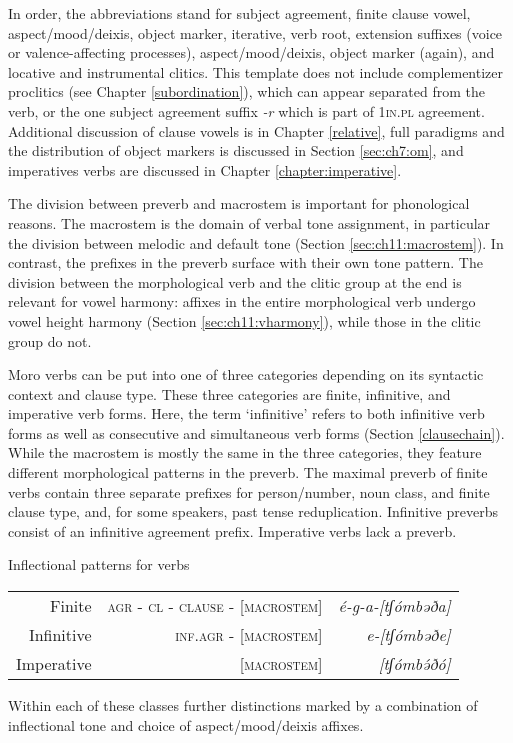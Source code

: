 In order, the abbreviations stand for subject agreement, finite clause vowel, aspect/mood/deixis, object marker, iterative, verb root, extension suffixes (voice or valence-affecting processes), aspect/mood/deixis, object marker (again), and locative and instrumental clitics. This template does not include complementizer proclitics (see Chapter \ref{subordination}), which can appear separated from the verb, or the one subject agreement suffix \textit{-r} which is part of 1\textsc{in.pl} agreement. Additional discussion of clause vowels is in Chapter \ref{relative}, full paradigms and the distribution of object markers is discussed in Section \ref{sec:ch7:om}, and imperatives verbs are discussed in Chapter \ref{chapter:imperative}.

The division between preverb and macrostem is important for phonological reasons. The macrostem is the domain of verbal tone assignment, in particular the division between melodic and default tone (Section \ref{sec:ch11:macrostem}). In contrast, the prefixes in the preverb surface with their own tone pattern. The division between the morphological verb and the clitic group at the end is relevant for vowel harmony: affixes in the entire morphological verb undergo vowel height harmony (Section \ref{sec:ch11:vharmony}), while those in the clitic group do not.

Moro verbs can be put into one of three categories depending on its syntactic context and clause type. These three categories are finite, infinitive, and imperative verb forms. Here, the term `infinitive' refers to both infinitive verb forms as well as consecutive and simultaneous verb forms (Section \ref{clausechain}). While the macrostem is mostly the same in the three categories, they feature different morphological patterns in the preverb. The maximal preverb of finite verbs contain three separate prefixes for person/number, noun class, and finite clause type, and, for some speakers, past tense reduplication. Infinitive preverbs consist of an infinitive agreement prefix. Imperative verbs lack a preverb. 

\ea Inflectional patterns for verbs \label{ex:verbs:inflpattern}
\begin{tabular}[t]{rrr}
Finite 		& \textsc{agr} - \textsc{cl} - \textsc{clause} - [\textsc{macrostem}] & \textit{é-g-a-[tʃómbəða]} \\
Infinitive 	& \textsc{inf.agr} - [\textsc{macrostem}] 	& \textit{e-[tʃómbəðe]} \\
Imperative 	& [\textsc{macrostem}] 									& \textit{[tʃómbə́ðó]} \\	
\end{tabular} \z 
Within each of these classes further distinctions marked by a combination of inflectional tone and choice of aspect/mood/deixis affixes.

